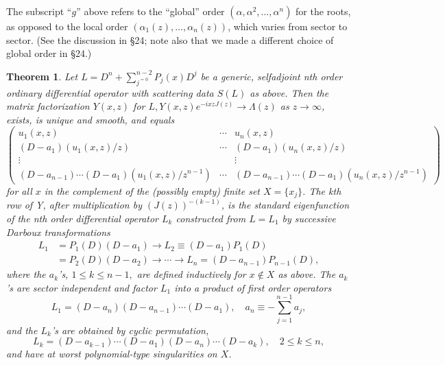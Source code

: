 \documentclass{surv-l}
\theoremstyle{plain}
\newtheorem{theorem}{Theorem}[section]
\theoremstyle{definition}
\numberwithin{equation}{chapter}
\begin{document}
The subscript ``$g$'' above refers to the ``global'' order $(\alpha,\alpha^{2},\ldots,\alpha^{n})$ for the roots, as opposed to the local order $(\alpha_{1}(z),\ldots,\alpha_{n}(z))$, which varies from sector to sector. (See the discussion in \S 24; note also that we made a different choice of global order in \S 24.)
\setcounter{theorem}{26}
\begin{theorem}\label{theo38.27}
Let $L=D^{n}+\sum_{j^{=0}}^{n-2}P_{j}(x)D^{j}$ be a generic, selfadjoint nth order ordinary differential operator with scattering data $S(L)$ as above. Then the matrix factorization $Y(x,z)$ for $L, Y(x, z)e^{-ixzJ(z)}\rightarrow\Lambda(z)$ as $ z\rightarrow\infty$, exists, is unique and smooth, and equals
\begin{equation*}
\left(\begin{array}{ccc}
u_{1}(x,z) &  \cdots & u_{n}(x,z)\\
(D-a_{1})(u_{1}(x,z)/z) & \cdots & (D-a_{1})(u_{n}(x,z)/z)\\
\vdots &  &  \vdots \\
(D-a_{n-1})\cdots (D-a_{1})(u_{1}(x,z)/z^{n-1}) & \cdots & (D-a_{n-1})\cdots (D-a_{1})(u_{n}(x,z)/z^{n-1})
\end{array}\right)
\end{equation*}
for all $x$ in the complement of the (possibly empty) finite set $X=\{x_{j}\}$. The kth row of Y, after multiplication by $(J(z))^{-(k-1)}$, is the standard eigenfunction of the nth order differential operator $L_{k}$ constructed from $L=L_{1}$ by successive Darboux transformations
\begin{align*}
L_{1}& =P_{1}(D)(D-a_{1})\rightarrow L_{2}\equiv(D-a_{1})P_{1}(D)\\
& =P_{2}(D)(D-a_{2})\rightarrow \cdots\rightarrow L_{n}=(D-a_{n-1})P_{n-1}(D),
\end{align*}
where the $a_{k}$'s, $1\leq k\leq n -1,$ are defined inductively for $x\not\in X$ as above. The $a_{k}$'s are sector independent and factor $L_{1}$ into a product of first order operators
\setcounter{equation}{27}
\begin{equation}\label{eq38.28}
L_{1}=(D-a_{n})(D-a_{n-1})\cdots (D-a_{1}), \quad a_{n}\equiv-\sum_{j=1}^{n-1}a_{j},
\end{equation}
and the $L_{k}$'s are obtained by cyclic permutation,
\begin{equation}\label{eq38.29}
L_{k}=(D-a_{k-1})\cdots(D-a_{1})(D-a_{n})\cdots (D-a_{k}), \quad 2\leq k\leq n,
\end{equation}
and have at worst polynomial-type singularities on $X$.


\end{theorem}
\end{document}
